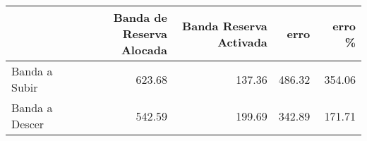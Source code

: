 \begin{tabular}{lrrrr}
\toprule
 & Banda de Reserva Alocada & Banda Reserva Activada & erro & erro \% \\
\midrule
Banda a Subir & 623.68 & 137.36 & 486.32 & 354.06 \\
Banda a Descer & 542.59 & 199.69 & 342.89 & 171.71 \\
\bottomrule
\end{tabular}

